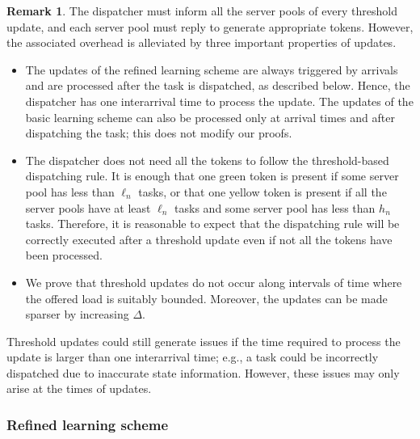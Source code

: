 \documentclass[a4paper, 12pt]{article}
\theoremstyle{definition}
\newtheorem{remark}{Remark}
\begin{document}
\begin{remark}
	\label{rem: on communication overhead}
	The dispatcher must inform all the server pools of every threshold update, and each server pool must reply to generate appropriate tokens. However, the associated overhead is alleviated by three important properties of updates.
	\begin{itemize}
		\item The updates of the refined learning scheme are always triggered by arrivals and are processed after the task is dispatched, as described below. Hence, the dispatcher has one interarrival time to process the update. The updates of the basic learning scheme can also be processed only at arrival times and after dispatching the task; this does not modify our proofs.
		
		\item The dispatcher does not need all the tokens to follow the threshold-based dispatching rule. It is enough that one green token is present if some server pool has less than $\ell_n$ tasks, or that one yellow token is present if all the server pools have at least $\ell_n$ tasks and some server pool has less than $h_n$ tasks. Therefore, it is reasonable to expect that the dispatching rule will be correctly executed after a threshold update even if not all the tokens have been processed.
		
		\item We prove that threshold updates do not occur along intervals of time where the offered load is suitably bounded. Moreover, the updates can be made sparser by increasing $\Delta$.
	\end{itemize}
	Threshold updates could still generate issues if the time required to process the update is larger than one interarrival time; e.g., a task could be incorrectly dispatched due to inaccurate state information. However, these issues may only arise at the times of updates.
\end{remark}

\subsubsection{Refined learning scheme}
\end{document}
